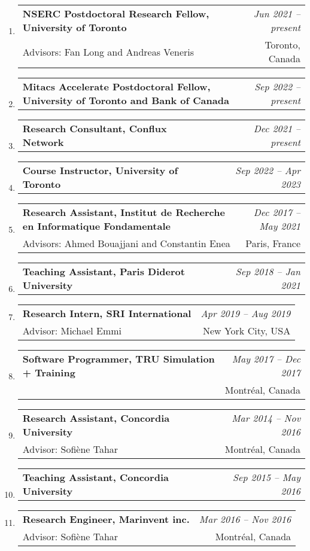 \documentclass[10pt]{article}
\makeatletter
\newcommand{\lbar}[1]{{\color{#1}\ding{118}}\hspace*{2pt}}
\newenvironment{benumerate}[2]{
    \let\oldItem\item
    \def\item{\addtocounter{enumi}{-2}\oldItem}
    \begin{enumerate}[#2] \itemsep3pt
    \setcounter{enumi}{#1}
    \addtocounter{enumi}{1}}
  {\end{enumerate}}
\newcommand{\positionnodesc}[2]
{%
\item
  \begin{tabular*}{7.5in}{l@{\extracolsep{\fill}}r}
    \textbf{#1} & \textit{#2}
  \end{tabular*}
}
\newenvironment{position}[4]
{%
\item
  \begin{tabular*}{7.5in}{l@{\extracolsep{\fill}}r}
    \textbf{#1} & \textit{#2} \\
    \hspace{1ex} #3 & \small{#4} \\
  \end{tabular*}
  }
  { %
}
\newenvironment{region}[3]{%
  \vspace*{0.5ex}
  {\scalebox{1.4}{\textbf{#1}}}
  \begin{benumerate}{#3}{\color{RoyalBlue}#2}}
  {\end{benumerate}\vspace{0.8ex}}
\newenvironment{nonumregion}[1]{%
\begin{region}{#1}{}{1}}
{\end{region}}
\makeatother
\begin{document}
\begin{nonumregion} {\lbar{black}Experience}
  \begin{position}{NSERC Postdoctoral Research Fellow, University of Toronto}{Jun 2021 -- present}
		{Advisors: Fan Long and Andreas Veneris}{Toronto, Canada}
  \end{position}
  \positionnodesc{Mitacs Accelerate Postdoctoral Fellow, University of Toronto and Bank of Canada}{Sep 2022 -- present}
  \positionnodesc{Research Consultant, Conflux Network}{Dec 2021 -- present}
  \positionnodesc{Course Instructor, University of Toronto}{Sep 2022 -- Apr 2023}
  \begin{position}{Research Assistant, Institut de Recherche en Informatique Fondamentale}{Dec 2017 -- May 2021}
		{Advisors: Ahmed Bouajjani and Constantin Enea}{Paris, France}
  \end{position}
  \positionnodesc{Teaching Assistant, Paris Diderot University}{Sep 2018 -- Jan 2021}
  \begin{position}{Research Intern, SRI International}{Apr 2019 -- Aug 2019}
		{Advisor: Michael Emmi}{New York City, USA}
  \end{position}
  \begin{position}{Software Programmer, TRU Simulation + Training}{May 2017 -- Dec 2017}
      {}{Montr\'{e}al, Canada}
  \end{position}
  \begin{position}{Research Assistant, Concordia University}{Mar 2014 -- Nov 2016}
		{Advisor: Sofi\`{e}ne Tahar}{Montr\'{e}al, Canada}
  \end{position}
  \positionnodesc{Teaching Assistant, Concordia University}{Sep 2015 -- May 2016}
  \begin{position}{Research Engineer, Marinvent inc.}{Mar 2016 -- Nov 2016}
		{Advisor: Sofi\`{e}ne Tahar}{Montr\'{e}al, Canada}
  \end{position}
  

\end{nonumregion}
\end{document}
